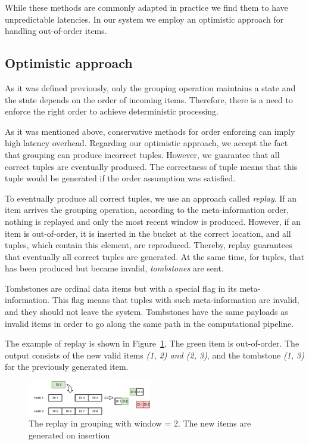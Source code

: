While these methods are commonly adapted in practice we find them to have unpredictable latencies. In our system we employ an optimistic approach for handling out-of-order items.

\subsection{Optimistic approach}

As it was defined previously, only the grouping operation maintains a state and the state depends on the order of incoming items. Therefore, there is a need to enforce the right order to achieve deterministic processing.

As it was mentioned above, conservative methods for order enforcing can imply high latency overhead. Regarding our optimistic approach, we accept the fact that grouping can produce incorrect tuples. However, we guarantee that all correct tuples are eventually produced. The correctness of tuple means that this tuple would be generated if the order assumption was satisfied.

To eventually produce all correct tuples, we use an approach called {\it replay}. If an item arrives the grouping operation, according to the meta-information order, nothing is replayed and only the most recent window is produced. However, if an item is out-of-order, it is inserted in the bucket at the correct location, and all tuples, which contain this element, are reproduced. Thereby, replay guarantees that eventually all correct tuples are generated. At the same time, for tuples, that has been produced but became invalid, {\it tombstones} are sent.

Tombstones are ordinal data items but with a special flag in its meta-information. This flag means that tuples with such meta-information are invalid, and they should not leave the system. Tombstones have the same payloads as invalid items in order to go along the same path in the computational pipeline.

The example of replay is shown in Figure~\ref{grouping-replaying}, The green item is out-of-order. The output consists of the new valid items {\it (1, 2) and (2, 3)}, and the tombstone {\it (1, 3)} for the previously generated item.

\begin{figure}[htbp]
  \centering
  \includegraphics[width=0.48\textwidth]{pics/grouping-replaying}
  \caption{The replay in grouping with window = 2. The new items are generated on insertion}
  \label {grouping-replaying}
\end{figure}

